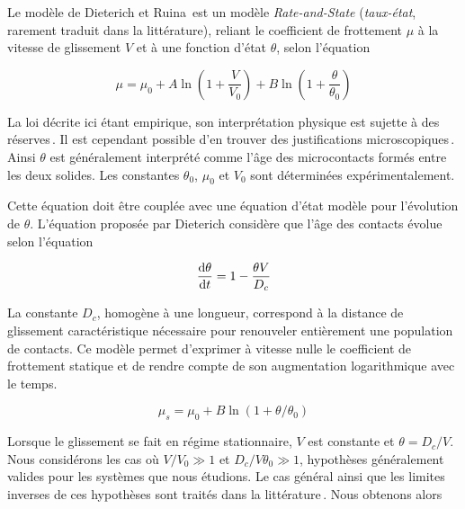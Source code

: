 \newpage

Le modèle de Dieterich et Ruina\,\cite{dieterich_modeling_1979,ruina_slip_1983} est un modèle \textit{Rate-and-State} (\textit{taux-état}, rarement traduit dans la littérature), reliant le coefficient de frottement $\mu$ à la vitesse de glissement $V$ et à une fonction d'état $\theta$, selon l'équation 

\begin{equation}
\mu = \mu_0+A\ln\left(1+\frac{V}{V_0}\right)+B\ln\left(1+\frac{\theta}{\theta_0}\right)
\end{equation}


La loi décrite ici étant empirique, son interprétation physique est sujette à des réserves\,\cite{dieterich_direct_1994}. Il est cependant possible d'en trouver des justifications microscopiques\,\cite{baumberger_physical_1999, nakatani_conceptual_2001,chen_microphysically_2017}. Ainsi $\theta$ est généralement interprété comme l'âge des microcontacts formés entre les deux solides. Les constantes $\theta_0$, $\mu_0$ et $V_0$ sont déterminées expérimentalement.

Cette équation doit être couplée avec une équation d'état modèle pour l'évolution de $\theta$. L'équation proposée par Dieterich considère que l'âge des contacts évolue selon l'équation

\begin{equation}
\frac{\mathrm{d} \theta }{\mathrm{d} t} = 1-\frac{\theta V}{D_c}
\end{equation}

La constante $D_c$, homogène à une longueur, correspond à la distance de glissement caractéristique nécessaire pour renouveler entièrement une population de contacts. Ce modèle permet d'exprimer à vitesse nulle le coefficient de frottement statique et de rendre compte de son augmentation logarithmique avec le temps.

\begin{equation}
\mu_s=\mu_0+B\ln(1+\theta/\theta_0)
\end{equation}

Lorsque le glissement se fait en régime stationnaire, $V$ est constante et $\theta = D_c/V$. Nous considérons les cas où $V/V_0\gg1$ et $D_c/V\theta_0\gg1$, hypothèses généralement valides pour les systèmes que nous étudions. Le cas général ainsi que les limites inverses de ces hypothèses sont traités dans la littérature\,\cite{bar-sinai_slow_2012, barsinai_velocitystrengthening_2014,bar-sinai_velocity-strengthening_2015}. Nous obtenons alors


